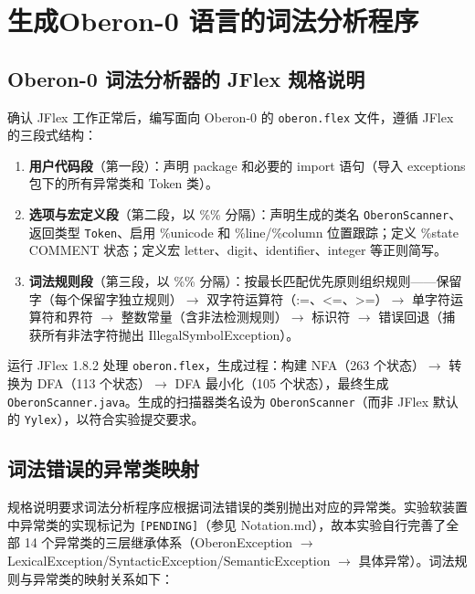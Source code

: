 \section{生成Oberon-0 语言的词法分析程序}

\subsection{Oberon-0 词法分析器的 JFlex 规格说明}

确认 JFlex 工作正常后，编写面向 Oberon-0 的 \texttt{oberon.flex} 文件，遵循 JFlex 的三段式结构：

\begin{enumerate}
    \item \textbf{用户代码段}（第一段）：声明 package 和必要的 import 语句（导入 exceptions 包下的所有异常类和 Token 类）。
    \item \textbf{选项与宏定义段}（第二段，以 \%\% 分隔）：声明生成的类名 \texttt{OberonScanner}、返回类型 \texttt{Token}、启用 \%unicode 和 \%line/\%column 位置跟踪；定义 \%state COMMENT 状态；定义宏 letter、digit、identifier、integer 等正则简写。
    \item \textbf{词法规则段}（第三段，以 \%\% 分隔）：按最长匹配优先原则组织规则——保留字（每个保留字独立规则）$\to$ 双字符运算符（:=、<=、>=）$\to$ 单字符运算符和界符 $\to$ 整数常量（含非法检测规则）$\to$ 标识符 $\to$ 错误回退（捕获所有非法字符抛出 IllegalSymbolException）。
\end{enumerate}

运行 JFlex 1.8.2 处理 \texttt{oberon.flex}，生成过程：构建 NFA（263 个状态）$\to$ 转换为 DFA（113 个状态）$\to$ DFA 最小化（105 个状态），最终生成 \texttt{OberonScanner.java}。生成的扫描器类名设为 \texttt{OberonScanner}（而非 JFlex 默认的 \texttt{Yylex}），以符合实验提交要求。

\subsection{词法错误的异常类映射}

规格说明要求词法分析程序应根据词法错误的类别抛出对应的异常类。实验软装置中异常类的实现标记为 \texttt{[PENDING]}（参见 Notation.md），故本实验自行完善了全部 14 个异常类的三层继承体系（OberonException $\to$ LexicalException/SyntacticException/SemanticException $\to$ 具体异常）。词法规则与异常类的映射关系如下：

